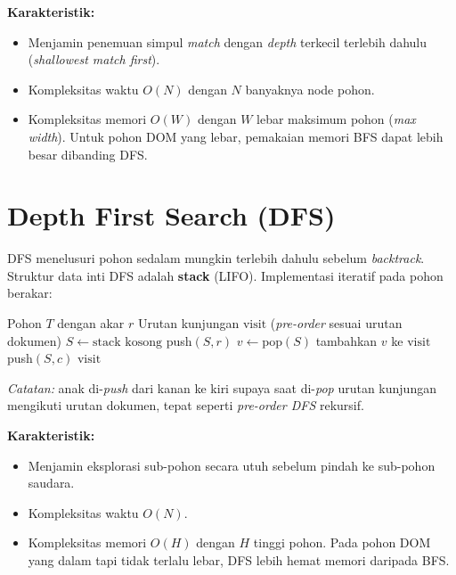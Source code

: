 \textbf{Karakteristik:}
\begin{itemize}
    \item Menjamin penemuan simpul \textit{match} dengan \textit{depth} terkecil terlebih dahulu (\textit{shallowest match first}).
    \item Kompleksitas waktu $O(N)$ dengan $N$ banyaknya node pohon.
    \item Kompleksitas memori $O(W)$ dengan $W$ lebar maksimum pohon (\textit{max width}). Untuk pohon DOM yang lebar, pemakaian memori BFS dapat lebih besar dibanding DFS.
\end{itemize}

\section{Depth First Search (DFS)}

DFS menelusuri pohon sedalam mungkin terlebih dahulu sebelum \textit{backtrack}. Struktur data inti DFS adalah \textbf{stack} (LIFO). Implementasi iteratif pada pohon berakar:

\begin{algorithm}[H]
\caption{DFS pada pohon berakar (iteratif)}
\begin{algorithmic}[1]
\Require Pohon $T$ dengan akar $r$
\Ensure Urutan kunjungan $\mathrm{visit}$ (\textit{pre-order} sesuai urutan dokumen)
\State $S \gets \text{stack kosong}$
\State push$(S, r)$
    \State $v \gets \text{pop}(S)$
    \State tambahkan $v$ ke $\mathrm{visit}$
        \State push$(S, c)$
    \EndFor
\EndWhile
\State \Return $\mathrm{visit}$
\end{algorithmic}
\end{algorithm}

\textit{Catatan:} anak di-\textit{push} dari kanan ke kiri supaya saat di-\textit{pop} urutan kunjungan mengikuti urutan dokumen, tepat seperti \textit{pre-order DFS} rekursif.

\textbf{Karakteristik:}
\begin{itemize}
    \item Menjamin eksplorasi sub-pohon secara utuh sebelum pindah ke sub-pohon saudara.
    \item Kompleksitas waktu $O(N)$.
    \item Kompleksitas memori $O(H)$ dengan $H$ tinggi pohon. Pada pohon DOM yang dalam tapi tidak terlalu lebar, DFS lebih hemat memori daripada BFS.
\end{itemize}

